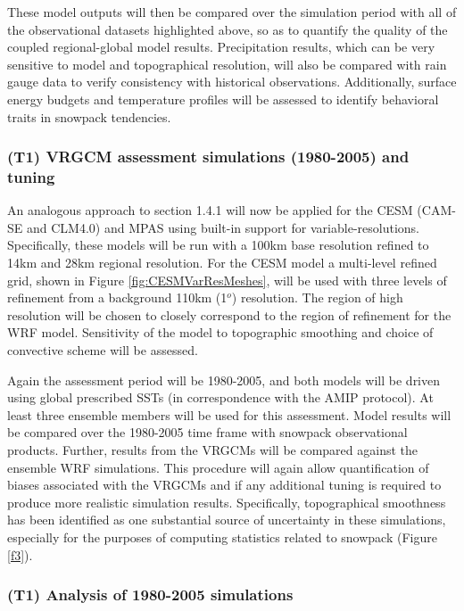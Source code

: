 \documentclass[11pt]{article}
\begin{document}
These model outputs will then be compared over the simulation period with all of the observational datasets highlighted above, so as to quantify the quality of the coupled regional-global model results. Precipitation results, which can be very sensitive to model and topographical resolution, will also be compared with rain gauge data to verify consistency with historical observations.  Additionally, surface energy budgets and temperature profiles will be assessed to identify behavioral traits in snowpack tendencies.



\subsubsection{(T1) VRGCM assessment simulations (1980-2005) and tuning}

An analogous approach to section 1.4.1 will now be applied  for  the  CESM  (CAM-SE and CLM4.0) and MPAS using built-in support for variable-resolutions.  Specifically, these models will be run with a 100km base resolution refined to 14km and 28km regional resolution. For the CESM model a multi-level refined grid, shown in Figure \ref{fig:CESMVarResMeshes}, will be used with three levels of refinement from a background 110km (1$^{o}$) resolution. The region of high resolution will be chosen to closely correspond to the region of refinement for the WRF model.  Sensitivity of the model to topographic smoothing and choice of convective scheme will be assessed.  %

Again the assessment period will be 1980-2005, and both models will be driven using global prescribed SSTs (in correspondence with the AMIP protocol).  At least three ensemble members will be used for this assessment. Model results will be compared over the 1980-2005 time frame with snowpack observational products. Further, results from the VRGCMs will be compared against the ensemble WRF simulations. This procedure will again allow quantification of biases associated with the VRGCMs and if any additional tuning is required to produce more realistic simulation results.  Specifically, topographical smoothness has been identified as one substantial source of uncertainty in these simulations, especially for the purposes of computing statistics related to snowpack (Figure \ref{f3}).

\subsubsection{(T1) Analysis of 1980-2005 simulations}
\end{document}
